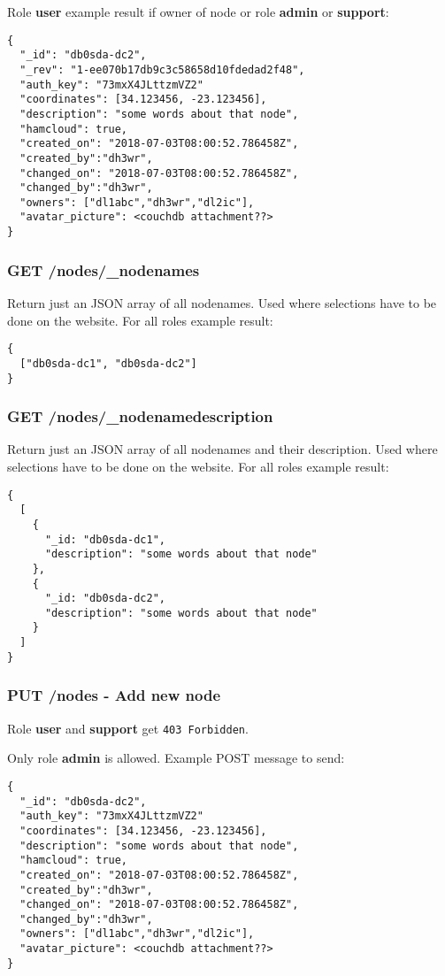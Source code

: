 Role \textbf{user} example result if owner of node or role \textbf{admin} or \textbf{support}:
\begin{lstlisting}
{
  "_id": "db0sda-dc2",
  "_rev": "1-ee070b17db9c3c58658d10fdedad2f48",
  "auth_key": "73mxX4JLttzmVZ2"
  "coordinates": [34.123456, -23.123456],
  "description": "some words about that node",
  "hamcloud": true,
  "created_on": "2018-07-03T08:00:52.786458Z",
  "created_by":"dh3wr",
  "changed_on": "2018-07-03T08:00:52.786458Z",
  "changed_by":"dh3wr",
  "owners": ["dl1abc","dh3wr","dl2ic"],
  "avatar_picture": <couchdb attachment??>
}
\end{lstlisting}

\subsubsection{GET /nodes/\_nodenames}
Return just an JSON array of all nodenames. Used where selections have to be done on the website.
For all roles example result:
\begin{lstlisting}
{
  ["db0sda-dc1", "db0sda-dc2"]
}
\end{lstlisting}

\subsubsection{GET /nodes/\_nodenamedescription}
Return just an JSON array of all nodenames and their description. Used where selections have to be done on the website.
For all roles example result:
\begin{lstlisting}
{
  [
    {
      "_id: "db0sda-dc1",
      "description": "some words about that node"
    },
    {
      "_id: "db0sda-dc2",
      "description": "some words about that node"
    }
  ]  
}
\end{lstlisting}



\subsubsection{PUT /nodes - Add new node}
Role \textbf{user} and \textbf{support} get \verb|403 Forbidden|.

Only role \textbf{admin} is allowed. Example POST message to send:
\begin{lstlisting}
{
  "_id": "db0sda-dc2",
  "auth_key": "73mxX4JLttzmVZ2"
  "coordinates": [34.123456, -23.123456],
  "description": "some words about that node",
  "hamcloud": true,
  "created_on": "2018-07-03T08:00:52.786458Z",
  "created_by":"dh3wr",
  "changed_on": "2018-07-03T08:00:52.786458Z",
  "changed_by":"dh3wr",
  "owners": ["dl1abc","dh3wr","dl2ic"],
  "avatar_picture": <couchdb attachment??>
}
\end{lstlisting}

